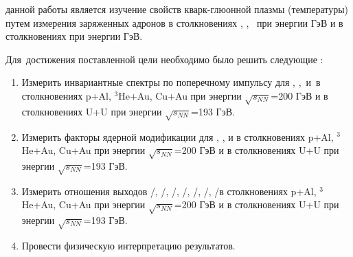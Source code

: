 \begin{comment}
\ifsynopsis
Этот абзац появляется только в~автореферате.
Для формирования блоков, которые будут обрабатываться только в~автореферате,
заведена проверка условия \verb!\!\verb!ifsynopsis!.
Значение условия задаётся в~основном файле документа (\verb!synopsis.tex! для
автореферата).
\else
Этот абзац появляется только в~диссертации.
Через проверку условия \verb!\!\verb!ifsynopsis!, задаваемого в~основном файле
документа (\verb!dissertation.tex! для диссертации), можно сделать новую
команду, обеспечивающую появление цитаты в~диссертации, но~не~в~автореферате.
\fi
\end{comment}

{\aim} данной работы является изучение свойств  кварк-глюонной плазмы (температуры) путем измерения заряженных адронов в столкновениях \pal, \heau, \cuau\, при энергии  ГэВ и в столкновениях \uu при энергии  ГэВ.

Для~достижения поставленной цели необходимо было решить следующие {\tasks}:
\begin{enumerate}[beginpenalty=10000] %
 \item Измерить инвариантные спектры по поперечному импульсу для \pipm, \Kpm, \prot\,и \aprot \,в столкновениях  p+Al, $^{3}$He+Au, Cu+Au при энергии $\sqrt{s_{NN}}$=200 ГэВ и в столкновениях U+U при энергии $\sqrt{s_{NN}}$=193 ГэВ.
\item Измерить факторы ядерной модификации для \pipm, \Kpm, \prot и \aprot в столкновениях  p+Al, $^{3}$He+Au, Cu+Au при энергии $\sqrt{s_{NN}}$=200 ГэВ и в столкновениях U+U при энергии $\sqrt{s_{NN}}$=193 ГэВ.

\item Измерить отношения выходов \pim/\pip, \Km/\Kp, \prot/\aprot, \prot/\pip, \aprot/\pim, \Kp/\pip, \Km/\pim в столкновениях  p+Al, $^{3}$He+Au, Cu+Au при энергии $\sqrt{s_{NN}}$=200 ГэВ и в столкновениях U+U при энергии $\sqrt{s_{NN}}$=193 ГэВ.
\item Провести физическую интерпретацию результатов.
\end{enumerate}


